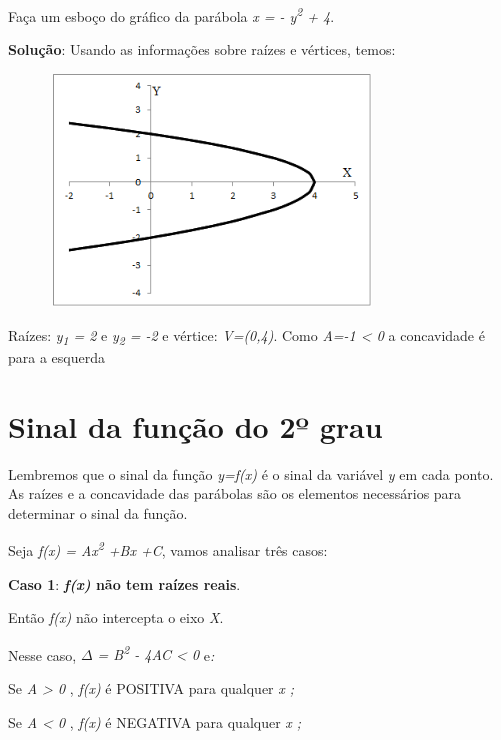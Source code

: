\begin{texemplo}
Faça um esboço do gráfico da parábola \textit{ x = - y\textsuperscript{2} + 4}. 

\textbf{Solução}:  Usando as informações sobre raízes e vértices, temos:

\begin{figure}[H]
	\begin{Center}
		\includegraphics[width=3.43in,height=2.43in]{capitulos/funcao_do_segundo_grau/media/image11.png}
	\end{Center}
\end{figure}

Raízes: \textit{y\textsubscript{1} = 2}   e  \textit{y\textsubscript{2} = -2}   e   vértice: \textit{V=(0,4)}. Como \textit{A=-1 < 0} a concavidade é para a esquerda \qedsymbol{}
\end{texemplo}

\section{Sinal da função do 2º grau}

Lembremos que o sinal da função \textit{y=f(x)} é o sinal da variável \textit{y} em cada ponto. As raízes e a concavidade das parábolas são os elementos necessários para determinar o sinal da função. 

Seja   \textit{f(x) = Ax\textsuperscript{2} +Bx +C}, vamos analisar três casos:

\textbf{Caso 1}: \textbf{\textit{f(x)} não tem raízes reais}.  

Então \textit{f(x)} não intercepta o eixo \textit{X}. 

Nesse caso, \textit{$ \Delta $  = B\textsuperscript{2} - 4AC < 0   }e\textit{:  }

Se \textit{A > 0} ,   \textit{f(x)} é POSITIVA para qualquer \textit{x   ;}

Se \textit{A < 0} ,   \textit{f(x)} é NEGATIVA para qualquer \textit{x   ;}

